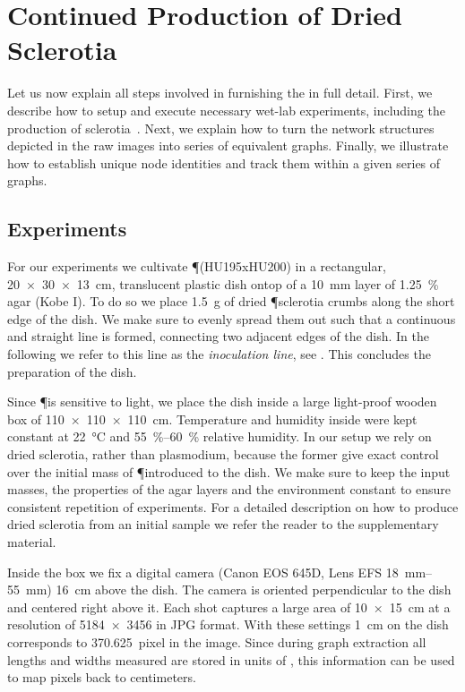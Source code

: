 
\chapter{Continued Production of Dried Sclerotia}\label{app:smgr}

	Let us now explain all steps involved in furnishing the \data in full detail. First, we describe how to setup and execute necessary wet-lab experiments, including the production of sclerotia~\cite{lifecycle}. Next, we explain how to turn the network structures depicted in the raw images into series of equivalent graphs. Finally, we illustrate how to establish unique node identities and track them within a given series of graphs.

	\section{Experiments}

		For our experiments we cultivate \P (HU195xHU200) in a rectangular, \SI{20 x 30 x 13}{\centi\metre}, translucent plastic dish ontop of a \SI{10}{\milli\metre} layer of \SI{1.25}{\percent} agar (Kobe I). To do so we place \SI{1.5}{\gram} of dried \P sclerotia crumbs along the short edge of the dish. We make sure to evenly spread them out such that a continuous and straight line is formed, connecting two adjacent edges of the dish. In the following we refer to this line as the \emph{inoculation line}, see . This concludes the preparation of the dish. 

		Since \P is sensitive to light, we place the dish inside a large light-proof wooden box of \SI{110 x 110 x 110}{\centi\metre}. Temperature and humidity inside were kept constant at \SI{22}{\celsius} and \SIrange{55}{60}{\percent} relative humidity. In our setup we rely on dried sclerotia, rather than plasmodium, because the former give exact control over the initial mass of \P introduced to the dish. We make sure to keep the input masses, the properties of the agar layers and the environment constant to ensure consistent repetition of experiments. For a detailed description on how to produce dried sclerotia from an initial sample we refer the reader to the supplementary material.

		Inside the box we fix a digital camera (Canon EOS 645D, Lens EFS \SIrange{18}{55}{\milli\metre}) \SI{16}{\centi\metre} above the dish. The camera is oriented perpendicular to the dish and centered right above it. Each shot captures a large area of \SI{10 x 15}{\centi\metre} at a resolution of \SI{5184 x 3456}{\pixel} in JPG format. With these settings \SI{1}{\centi\metre} on the dish corresponds to \SI{370.625}{pixel} in the image. Since during graph extraction all lengths and widths measured are stored in units of \si{\pixel}, this information can be used to map pixels back to centimeters.

